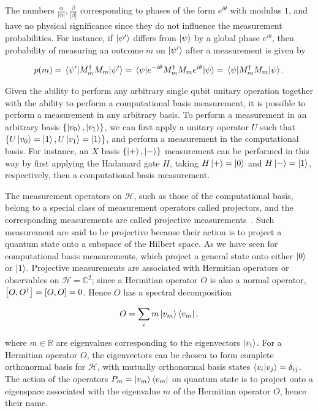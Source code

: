 \noindent
The numbers $\frac{\alpha}{|\alpha|}, \frac{\beta}{|\beta|}$ corresponding to
phases of the form $e^{i\theta}$ with modulus $1$, and have no physical significance since they do not influence the measurement probabilities. For instance, if $\ket{\psi'}$ differs from $\ket{\psi}$ by a global phase $e^{i\theta}$, then probability of measuring an outcome $m$ on $\ket{\psi'}$ after a measurement is given by

\begin{align}
	p(m) = \expval{M^{\dagger}_mM_m}{\psi'} = \expval{e^{-i\theta}M^{\dagger}_m M_m e^{i\theta}}{\psi} = \expval{M^{\dagger}_m M_m}{\psi}.
\end{align}

\noindent
Given the ability to perform any arbitrary single qubit unitary operation together with the ability to perform a computational basis measurement, it is possible to perform a measurement in any arbitrary basis. To perform a measurement in an arbitrary basis $\{\ket{v_0}, \ket{v_1}\}$, we can first apply a unitary operator $U$ such that $\{U\ket{v_0} = \ket{1}, U\ket{v_1}= \ket{1}\}$, and perform a measurement in the computational basis. For instance, an $X$ basis $\{\ket{+}, \ket{-}\}$ measurement can be performed in this way by first applying the Hadamard gate $H$, taking $H\ket{+}=\ket{0}$ and $H\ket{-}=\ket{1}$, respectively, then a computational basis measurement.

\bigskip
\noindent
The measurement operators on $\mathcal{H}$, such as those of the computational basis, belong to a special class of measurement operators called projectors, and the corresponding measurements are called projective measurements~\cite{Mike&Ike}. Such measurement are said to be projective because their action is to project a quantum state onto a subspace of the Hilbert space. As we have seen for computational basis measurements, which project a general state onto either $\ket{0}$ or $\ket{1}$. Projective measurements are associated with Hermitian operators or observables on $\mathcal{H}=\mathbb{C}^2$; since a Hermitian operator $O$ is also a normal operator, \ie $\comm{O}{O^{\dagger}} = \comm{O}{O} =  0$. Hence $O$ has a spectral decomposition

\begin{align}
	O = \displaystyle\sum_{i} m \ket{v_m}\bra{v_m},
\end{align}

\noindent
where $m \in \mathbb{R}$ are eigenvalues corresponding to the eigenvectors $\ket{v_i}$. For a Hermitian operator $O$, the eigenvectors can be chosen to form complete orthonormal basis for $\mathcal{H}$, with mutually orthonormal basis states $\braket{v_i}{v_j} = \delta_{ij}$. The action of the operators $P_m = \ket{v_m}\bra{v_m}$ on quantum state is to project onto a eigenspace associated with the eigenvalue $m$ of the Hermitian operator $O$, hence their name. 

